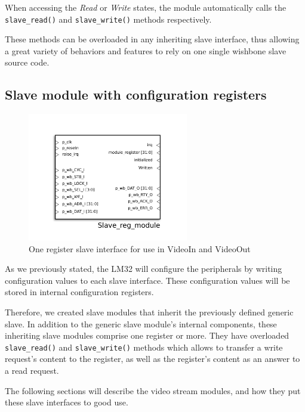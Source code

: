 When accessing the \emph{Read} or \emph{Write} states, the module automatically calls the \texttt{slave\_read()} and \texttt{slave\_write()} methods respectively.

These methods can be overloaded in any inheriting slave interface, thus allowing a great variety of behaviors and features to rely on one single wishbone slave source code.

\subsection{Slave module with configuration registers}
\label{wb_reg_slave}

\begin{figure}[H]
\center
\includegraphics[width=7cm]{figs/slave_reg_hdl_symbol.pdf}
\caption{One register slave interface for use in VideoIn and VideoOut}
\label{reg_slave_interface}
\end{figure}



As we previously stated, the LM32 will configure the peripherals by writing configuration values to each slave interface.
These configuration values will be stored in internal configuration registers.

Therefore, we created slave modules that inherit the previously defined generic slave.
In addition to the generic slave module's internal components, these inheriting slave modules comprise one register or more.
They have overloaded \texttt{slave\_read()} and \texttt{slave\_write()} methods which allows to transfer a write request's content to the register, as well as the register's content as an answer to a read request.

The following sections will describe the video stream modules, and how they put these slave interfaces to good use.
